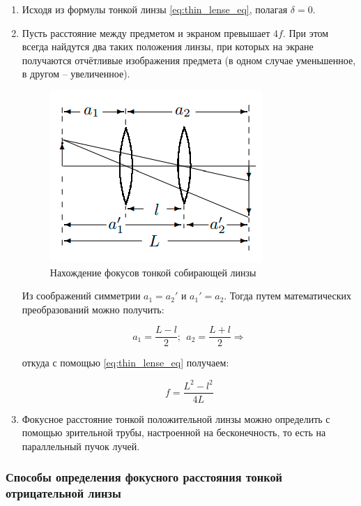 	\begin{enumerate}
		\item Исходя из формулы тонкой линзы \eqref{eq:thin_lense_eq}, полагая $\delta = 0$.
		
		\item Пусть расстояние между предметом и экраном превышает $4f$. При этом всегда найдутся два таких положения линзы, при которых на экране получаются отчётливые изображения предмета (в одном случае уменьшенное, в другом -- увеличенное).
		
		\begin{figure}
			\centering
			\includegraphics[scale=0.5]{images/second_method.png}
			\caption{Нахождение фокусов тонкой собирающей линзы}
			\label{fig:second_method}
		\end{figure}
	
		Из соображений симметрии $a_1 = a_2'$ и $a_1' = a_2$. Тогда путем математических преобразований можно получить:
		
		\[ a_1 = \frac{L - l}{2}; ~~ a_2 = \frac{L + l}{2} \Rightarrow \]
		
		откуда с помощью \eqref{eq:thin_lense_eq} получаем:
		
		\begin{equation} \label{eq:second_method}
			f = \frac{L^2 - l^2}{4L}
		\end{equation}
		
		\item Фокусное расстояние тонкой положительной линзы можно определить с помощью зрительной трубы, настроенной на бесконечность, то есть на параллельный пучок лучей.
	\end{enumerate}

	\subsubsection*{Способы определения фокусного расстояния тонкой отрицательной линзы}
	
